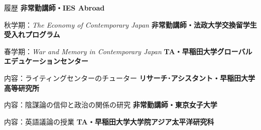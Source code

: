 \begin{rubric}{履歴}
\entry*[2024/9 -- 現在]%
	\textbf{非常勤講師・IES Abroad}
        \par 秋学期：\emph{The Economy of Contemporary Japan}
\entry*[2024/4 -- 現在]%
	\textbf{非常勤講師・法政大学交換留学生受入れプログラム}
        \par 春学期：\emph{War and Memory in Contemporary Japan}
\entry*[2019/9 -- 現在]%
	\textbf{TA・早稲田大学グローバルエデュケーションセンター}
        \par 内容：ライティングセンターのチューター
%
%
%
\entry*[2023/9 -- 現在]%
	\textbf{リサーチ･アシスタント・早稲田大学高等研究所}
        \par 内容：陰謀論の信仰と政治の関係の研究
 \entry*[2023/9 -- 2024/3]%
	\textbf{非常勤講師・東京女子大学}
        \par 内容：英語議論の授業
\entry*[2023/4 -- 2024/3]%
	\textbf{TA・早稲田大学大学院アジア太平洋研究科}
\end{rubric}